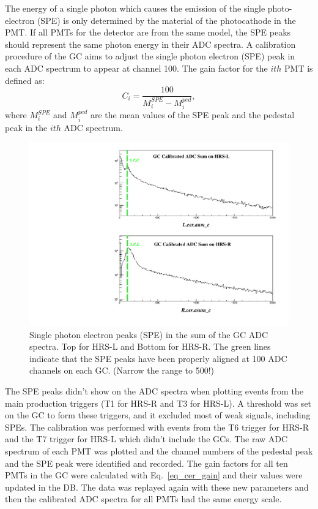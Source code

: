 The energy of a single photon which causes the emission of the single photo-electron (SPE) is only determined by the material of the photocathode in the PMT. If all PMTs for the detector are from the same model, the SPE peaks should represent the same photon energy in their ADC spectra. A calibration procedure of the GC aims to adjust the single photon electron (SPE) peak in each ADC spectrum to appear at channel 100. The gain factor for the $ith$ PMT is defined as:
\begin{equation}
  C_{i} = \frac{100}{M_{i}^{SPE}-M_{i}^{ped}},
  \label{eq_cer_gain}
\end{equation}
where $M_{i}^{SPE}$ and $M_{i}^{ped}$ are the mean values of the SPE peak and the pedestal peak in the $ith$ ADC spectrum. 
\begin{figure}[!ht]
  \begin{center}
    \includegraphics[type=pdf,ext=.pdf,read=.pdf,width=0.60\linewidth]{./figures/cer/Cer_SPE}
    \caption[Single electron peaks on both GCs]{\footnotesize{Single photon electron peaks (SPE) in the sum of the GC ADC spectra. Top for HRS-L and Bottom for HRS-R. The green lines indicate that the SPE peaks have been properly aligned at 100 ADC channels on each GC. (Narrow the range to 500!)}}
  \label{cer_spe}
  \end{center}
\end{figure}

 The SPE peaks didn't show on the ADC spectra when plotting events from the main production triggers (T1 for HRS-R and T3 for HRS-L). A threshold was set on the GC to form these triggers, and it excluded most of weak signals, including SPEs. The calibration was performed with events from the T6 trigger for HRS-R and the T7 trigger for HRS-L which didn't include the GCs. The raw ADC spectrum of each PMT was plotted and the channel numbers of the pedestal peak and the SPE peak were identified and recorded. The gain factors for all ten PMTs in the GC were calculated with Eq.~\eqref{eq_cer_gain} and their values were updated in the DB. The data was replayed again with these new parameters and then the calibrated ADC spectra for all PMTs had the same energy scale.
 
